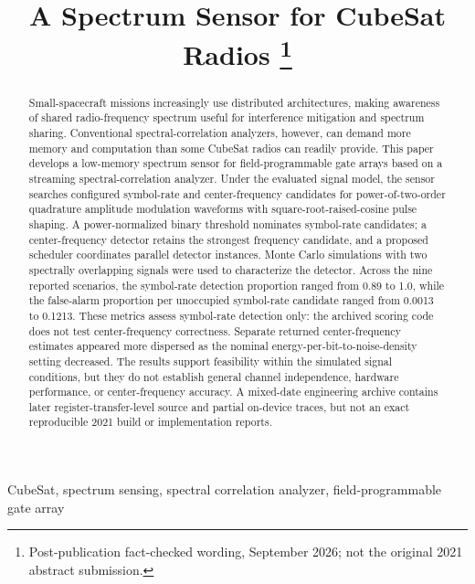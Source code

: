 \documentclass[conference,onecolumn]{IEEEtran}
\begin{document}
\title{A Spectrum Sensor for CubeSat Radios%
\thanks{Post-publication fact-checked wording, September 2026; not the original 2021 abstract submission.}}

\author{
}

\maketitle

\begin{abstract}
Small-spacecraft missions increasingly use distributed architectures, making awareness of shared radio-frequency spectrum useful for interference mitigation and spectrum sharing. Conventional spectral-correlation analyzers, however, can demand more memory and computation than some CubeSat radios can readily provide. This paper develops a low-memory spectrum sensor for field-programmable gate arrays based on a streaming spectral-correlation analyzer. Under the evaluated signal model, the sensor searches configured symbol-rate and center-frequency candidates for power-of-two-order quadrature amplitude modulation waveforms with square-root-raised-cosine pulse shaping. A power-normalized binary threshold nominates symbol-rate candidates; a center-frequency detector retains the strongest frequency candidate, and a proposed scheduler coordinates parallel detector instances. Monte Carlo simulations with two spectrally overlapping signals were used to characterize the detector. Across the nine reported scenarios, the symbol-rate detection proportion ranged from 0.89 to 1.0, while the false-alarm proportion per unoccupied symbol-rate candidate ranged from 0.0013 to 0.1213. These metrics assess symbol-rate detection only: the archived scoring code does not test center-frequency correctness. Separate returned center-frequency estimates appeared more dispersed as the nominal energy-per-bit-to-noise-density setting decreased. The results support feasibility within the simulated signal conditions, but they do not establish general channel independence, hardware performance, or center-frequency accuracy. A mixed-date engineering archive contains later register-transfer-level source and partial on-device traces, but not an exact reproducible 2021 build or implementation reports.
\end{abstract}

\begin{IEEEkeywords}
CubeSat, spectrum sensing, spectral correlation analyzer, field-programmable gate array
\end{IEEEkeywords}
\end{document}
